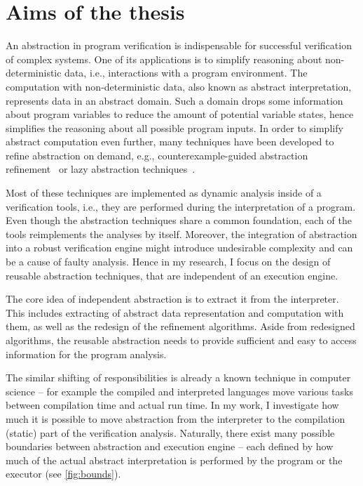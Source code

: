 \chapter{Aims of the thesis}
\label{ch:aim}


An abstraction in program verification is indispensable for successful
verification of complex systems. One of its applications is to simplify
reasoning about non-deterministic data, i.e., interactions with a program
environment. The computation with non-de\-ter\-mi\-nistic data, also known as
abstract interpretation, represents data in an abstract domain. Such a domain
drops some information about program variables to reduce the amount of
potential variable states, hence simplifies the reasoning about all possible
program inputs. In order to simplify abstract computation even further, many
techniques have been developed to refine abstraction on demand, e.g.,
counterexample-guided abstraction refinement~\cite{Clarke2000} or lazy abstraction
techniques~\cite{Henzinger2002}.

Most of these techniques are implemented as dynamic analysis inside of a
verification tools, i.e., they are performed during the interpretation of a
program. Even though the abstraction techniques share a common foundation, each
of the tools reimplements the analyses by itself. Moreover, the integration of
abstraction into a robust verification engine might introduce undesirable
complexity and can be a cause of faulty analysis. Hence in my research, I focus
on the design of reusable abstraction techniques, that are independent of an
execution engine.

The core idea of independent abstraction is to extract it from the interpreter.
This includes extracting of abstract data representation and computation with
them, as well as the redesign of the refinement algorithms. Aside from
redesigned algorithms, the reusable abstraction needs to provide sufficient and
easy to access information for the program analysis.

The similar shifting of responsibilities is already a known technique in
computer science -- for example the compiled and interpreted languages move
various tasks between compilation time and actual run time. In my work, I
investigate how much it is possible to move abstraction from the interpreter to
the compilation (static) part of the verification analysis. Naturally, there
exist many possible boundaries between abstraction and execution engine -- each
defined by how much of the actual abstract interpretation is performed by the
program or the executor (see \autoref{fig:bounds}).

